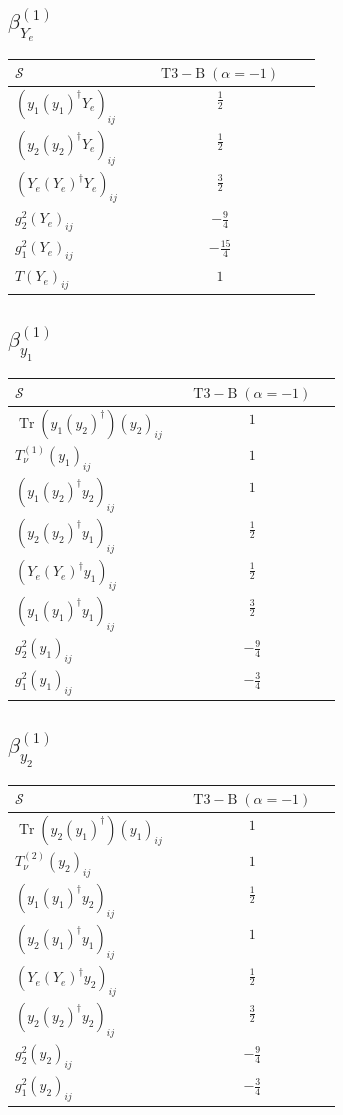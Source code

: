 \documentclass[9pt]{article}
\begin{document}
\subsection*{$ \beta_{Y_e}^{(1)} $}
\begin{longtable}{@{}p{0.38\linewidth}c@{}}
\toprule
$\mathcal{S}$ & $ \mathrm{T3-B}\;(\alpha=-1) $ \\
\midrule
$ (y_1 (y_1)^{\dagger} Y_e)_{ij} $ & $ \frac{1}{2} $ \\
$ (y_2 (y_2)^{\dagger} Y_e)_{ij} $ & $ \frac{1}{2} $ \\
$ (Y_e (Y_e)^{\dagger} Y_e)_{ij} $ & $ \frac{3}{2} $ \\
$ g_2^2 (Y_e)_{ij} $ & $ - \frac{9}{4} $ \\
$ g_1^2 (Y_e)_{ij} $ & $ - \frac{15}{4} $ \\
$ T (Y_e)_{ij} $ & $ 1 $ \\
\bottomrule
\end{longtable}
\subsection*{$ \beta_{y_1}^{(1)} $}
\begin{longtable}{@{}p{0.38\linewidth}c@{}}
\toprule
$\mathcal{S}$ & $ \mathrm{T3-B}\;(\alpha=-1) $ \\
\midrule
$ \operatorname{Tr}\!(y_1 (y_2)^{\dagger}) (y_2)_{ij} $ & $ 1 $ \\
$ T_{\nu}^{(1)} (y_1)_{ij} $ & $ 1 $ \\
$ (y_1 (y_2)^{\dagger} y_2)_{ij} $ & $ 1 $ \\
$ (y_2 (y_2)^{\dagger} y_1)_{ij} $ & $ \frac{1}{2} $ \\
$ (Y_e (Y_e)^{\dagger} y_1)_{ij} $ & $ \frac{1}{2} $ \\
$ (y_1 (y_1)^{\dagger} y_1)_{ij} $ & $ \frac{3}{2} $ \\
$ g_2^2 (y_1)_{ij} $ & $ - \frac{9}{4} $ \\
$ g_1^2 (y_1)_{ij} $ & $ - \frac{3}{4} $ \\
\bottomrule
\end{longtable}
\subsection*{$ \beta_{y_2}^{(1)} $}
\begin{longtable}{@{}p{0.38\linewidth}c@{}}
\toprule
$\mathcal{S}$ & $ \mathrm{T3-B}\;(\alpha=-1) $ \\
\midrule
$ \operatorname{Tr}\!(y_2 (y_1)^{\dagger}) (y_1)_{ij} $ & $ 1 $ \\
$ T_{\nu}^{(2)} (y_2)_{ij} $ & $ 1 $ \\
$ (y_1 (y_1)^{\dagger} y_2)_{ij} $ & $ \frac{1}{2} $ \\
$ (y_2 (y_1)^{\dagger} y_1)_{ij} $ & $ 1 $ \\
$ (Y_e (Y_e)^{\dagger} y_2)_{ij} $ & $ \frac{1}{2} $ \\
$ (y_2 (y_2)^{\dagger} y_2)_{ij} $ & $ \frac{3}{2} $ \\
$ g_2^2 (y_2)_{ij} $ & $ - \frac{9}{4} $ \\
$ g_1^2 (y_2)_{ij} $ & $ - \frac{3}{4} $ \\
\bottomrule
\end{longtable}
\end{document}
